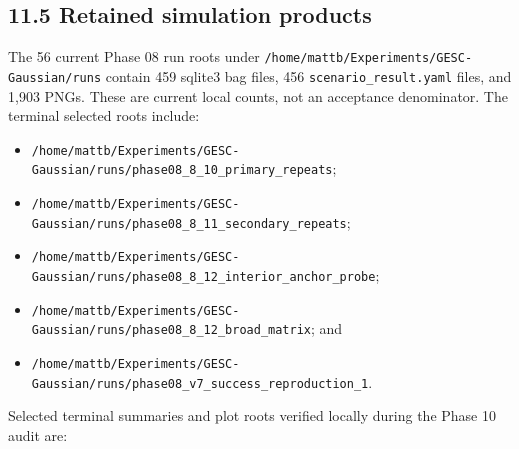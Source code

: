 \documentclass[
  10pt,
  letterpaper,
]{article}
\providecommand{\tightlist}{%
  \setlength{\itemsep}{0pt}\setlength{\parskip}{0pt}}
\begin{document}
\subsection{11.5 Retained simulation products}\label{retained-simulation-products}

The 56 current Phase 08 run roots under
\nolinkurl{/home/mattb/Experiments/GESC-Gaussian/runs} contain 459 sqlite3 bag files,
456 \nolinkurl{scenario\_result.yaml} files, and 1,903 PNGs. These are current local
counts, not an acceptance denominator. The terminal selected roots include:

\begin{itemize}
\tightlist
\item
  \nolinkurl{/home/mattb/Experiments/GESC-Gaussian/runs/phase08\_8\_10\_primary\_repeats};
\item
  \nolinkurl{/home/mattb/Experiments/GESC-Gaussian/runs/phase08\_8\_11\_secondary\_repeats};
\item
  \nolinkurl{/home/mattb/Experiments/GESC-Gaussian/runs/phase08\_8\_12\_interior\_anchor\_probe};
\item
  \nolinkurl{/home/mattb/Experiments/GESC-Gaussian/runs/phase08\_8\_12\_broad\_matrix}; and
\item
  \nolinkurl{/home/mattb/Experiments/GESC-Gaussian/runs/phase08\_v7\_success\_reproduction\_1}.
\end{itemize}

Selected terminal summaries and plot roots verified locally during the Phase
10 audit are:
\end{document}
